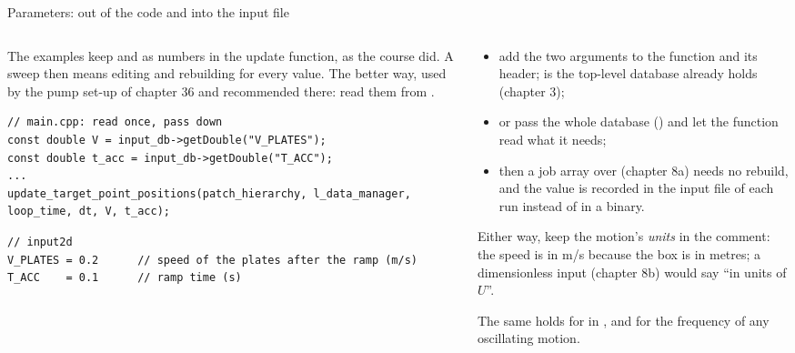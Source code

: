 \documentclass[aspectratio=169,11pt]{beamer}
\begin{document}
\begin{frame}[fragile]{Parameters: out of the code and into the input file}
\label{fr:params}
\begin{columns}[T,onlytextwidth]
\begin{column}{0.5\textwidth}
\footnotesize The examples keep  and  as  numbers in the update function, as the course did. A sweep then means editing and rebuilding for every value. The better way, used by the pump set-up of chapter 36 and recommended there: read them from .
\begin{lstlisting}[style=cpptiny]
// main.cpp: read once, pass down
const double V = input_db->getDouble("V_PLATES");
const double t_acc = input_db->getDouble("T_ACC");
...
update_target_point_positions(patch_hierarchy, l_data_manager, loop_time, dt, V, t_acc);
\end{lstlisting}
\begin{lstlisting}[style=input]
// input2d
V_PLATES = 0.2      // speed of the plates after the ramp (m/s)
T_ACC    = 0.1      // ramp time (s)
\end{lstlisting}
\end{column}
\begin{column}{0.48\textwidth}
\footnotesize
\begin{itemize}
  \item add the two arguments to the function and its header;  is the top-level database  already holds (chapter 3);
  \item or pass the whole database () and let the function read what it needs;
  \item then a job array over  (chapter 8a) needs no rebuild, and the value is recorded in the input file of each run instead of in a binary.
\end{itemize}
\footnotesize Either way, keep the motion's \emph{units} in the comment: the speed is in m/s because the box is in metres; a dimensionless input (chapter 8b) would say ``in units of $U$''.
\vspace{1mm}

\footnotesize The same holds for  in , and for the frequency of any oscillating motion.
\end{column}
\end{columns}
\end{frame}
\end{document}
